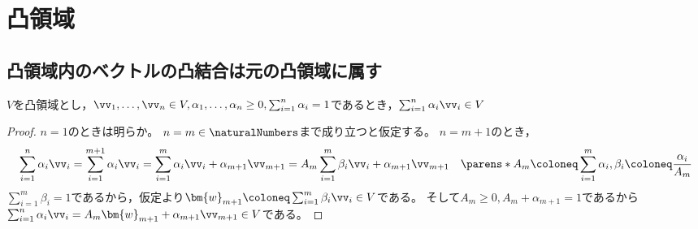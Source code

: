 \chapter{凸領域}
    \section{凸領域内のベクトルの凸結合は元の凸領域に属す}
        \begin{shadebox}
            $V$を凸領域とし，$\vv_1,\dotsc,\vv_n\in V,\alpha_1,\dotsc,\alpha_n\geq 0,\sum_{i=1}^n\alpha_i = 1$であるとき，$\sum_{i=1}^n\alpha_i\vv_i \in V$
        \end{shadebox}
        \begin{proof}
            $n=1$のときは明らか。
            $n=m\in\naturalNumbers$まで成り立つと仮定する。
            $n=m+1$のとき，
            \[ \sum_{i=1}^n\alpha_i\vv_i = \sum_{i=1}^{m+1}\alpha_i\vv_i = \sum_{i=1}^m\alpha_i\vv_i + \alpha_{m+1}\vv_{m+1} = A_m\sum_{i=1}^m\beta_i\vv_i + \alpha_{m+1}\vv_{m+1} \quad \parens*{A_m \coloneq \sum_{i=1}^m\alpha_i,\beta_i \coloneq \frac{\alpha_i}{A_m}} \]
            $\sum_{i=1}^m\beta_i = 1$であるから，仮定より$\bm{w}_{m+1} \coloneq \sum_{i=1}^m\beta_i\vv_i\in V$である。
            そして$A_m\geq 0,A_m + \alpha_{m+1} = 1$であるから$\sum_{i=1}^n\alpha_i\vv_i = A_m\bm{w}_{m+1} + \alpha_{m+1}\vv_{m+1} \in V$である。
        \end{proof}

